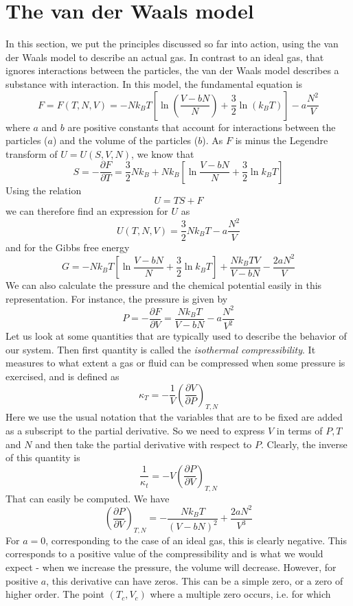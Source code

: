 \documentclass[a4paper, draft]{report}
\numberwithin{section}{chapter}
\numberwithin{equation}{chapter}
\theoremstyle{own}
\theoremstyle{remark}
\begin{document}
\section{The van der Waals model}

In this section, we put the principles discussed so far into action, using the van der Waals model to describe an actual gas. In contrast to an ideal gas, that ignores interactions between the particles, the van der Waals model describes a substance with interaction. In this model, the fundamental equation is
$$
F = F(T,N,V) = - N k_B T [   \ln(\frac{V-bN}{N}) + \frac{3}{2} \ln (k_B T)] - a \frac{N^2}{V}
$$
where $a$ and $b$ are positive constants that account for interactions between the particles ($a$) and the volume of the particles ($b$). As $F$ is minus the Legendre transform of $U=U(S,V,N)$, we know that
$$
S = - \frac{\partial F}{\partial T} = \frac{3}{2} N k_B + 
N k_B [\ln \frac{V-bN}{N} + \frac{3}{2} \ln k_B T]
$$
Using the relation
$$
U = TS + F
$$
we can therefore find an expression for $U$ as
$$
U(T,N,V) = \frac{3}{2} N k_B T - a \frac{N^2}{V}
$$
and for the Gibbs free energy
$$
G = - N k_B T [ \ln\frac{V-bN}{N} + \frac{3}{2} \ln k_B T] + \frac{N k_B TV}{V-bN} 
-\frac{2aN^2}{V	}
$$
We can also calculate the pressure and the chemical potential easily in this representation. For instance, the pressure is given by 
$$
P = - \frac{\partial F}{\partial V} =  \frac{N k_B T}{V-bN}  - a \frac{N^2}{V^2}
$$
Let us look at some quantities that are typically used to describe the behavior of our system. Then first quantity is called the {\em isothermal compressibility}. It measures to what extent a gas or fluid can be compressed when some pressure is exercised, and is defined as
$$
\kappa_T = - \frac{1}{V}  (\frac{\partial V}{\partial P})_{T,N}
$$
Here we use the usual notation that the variables that are to be fixed are added as a subscript to the partial derivative. So we need to express $V$ in terms of $P,T$ and $N$ and then take the partial derivative with respect to $P$. Clearly, the inverse of this quantity is
$$
\frac{1}{\kappa_t} = - V  (\frac{\partial P}{\partial V})_{T,N}
$$
That can easily be computed. We have
$$
(\frac{\partial P}{\partial V})_{T,N} = - \frac{N k_B T}{(V - bN)^2} + \frac{2aN^2}{V^3}
$$
For $a = 0$, corresponding to the case of an ideal gas, this is clearly negative. This corresponds to a positive value of the compressibility and is what we would expect - when we increase the pressure, the volume will decrease. However, for positive $a$, this derivative can have zeros. This can be a simple zero, or a zero of higher order. The point $(T_c, V_c)$ where a multiple zero occurs, i.e. for which
\end{document}
